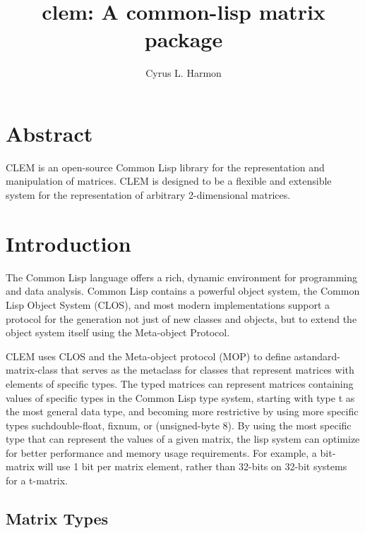\documentclass[10pt]{article}
\title{clem: A common-lisp matrix package}
\author{Cyrus L. Harmon}
\begin{document}
\maketitle
\let\mypdfximage\pdfximage
\def\pdfximage{\immediate\mypdfximage}
\baselineskip14pt


\clearpage
\section{Abstract}
CLEM is an open-source Common Lisp library for the
 representation and manipulation of matrices. CLEM is designed to
 be a flexible and extensible system for the representation of
 arbitrary 2-dimensional matrices.

\clearpage
\section{Introduction}
The Common Lisp language\cite{steele1990common} offers a rich, dynamic environment for programming and
data analysis. Common Lisp contains a powerful object system, the
Common Lisp Object System (CLOS)\cite{keene1989object}, and most modern implementations support a protocol for
the generation not just of new classes and objects, but to extend
the object system itself using the Meta-object Protocol\cite{kiczales1991art}.

CLEM uses CLOS and the Meta-object protocol (MOP) to define astandard-matrix-class that serves as the metaclass for classes that represent
matrices with elements of specific types. The typed matrices can
represent matrices containing values of specific types in the
Common Lisp type system, starting with type t as the most general data type, and becoming more restrictive by using more specific types suchdouble-float, fixnum, or (unsigned-byte 8). By using the most specific type that can represent the values of a given matrix, the lisp system can optimize for better performance and memory usage requirements. For example, a bit-matrix will use 1 bit per matrix element, rather than 32-bits on 32-bit systems for a t-matrix.

\baselineskip12pt
\subsection{Matrix Types}
\baselineskip14pt
\baselineskip12pt
\end{document}

